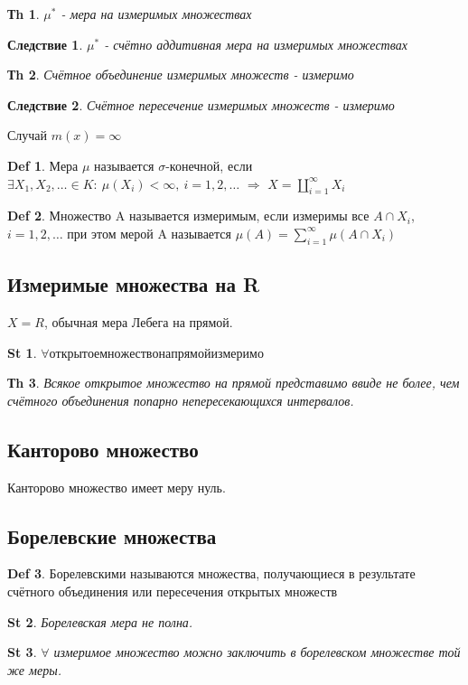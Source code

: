 \documentclass[14pt]{article}
\theoremstyle{plain}
\newtheorem{Thm}{Тh}
\newtheorem{St}{St}
\newtheorem{Sled}{Следствие}
\theoremstyle{definition}
\newtheorem{Def}{Def}
\begin{document}
		\begin{Thm}
			$\mu^*$ - мера на измеримых множествах
		\end{Thm}
		\begin{Sled}
			$\mu^{*}$ - счётно аддитивная мера на измеримых множествах
		\end{Sled}
		\begin{Thm}
			Счётное объединение измеримых множеств - измеримо
		\end{Thm}
		\begin{Sled}
			Счётное пересечение измеримых множеств - измеримо
		\end{Sled}
		Случай $m(x) = \infty$ \newline
		\begin{Def}
			Мера $\mu$ называется $\sigma$-конечной, если $\exists X_1, X_2, \dots \in K: \ \mu(X_i) < \infty, \ i = 1, 2, \dots $ $\Rightarrow$ $X = \coprod\limits_{i=1}^{\infty} X_i$
		\end{Def}
		\begin{Def}
			Множество A называется измеримым, если измеримы все $A \cap X_i$, $i = 1, 2, \dots$ при этом мерой A называется $\mu(A) = \sum\limits_{i=1}^{\infty} \mu(A \cap X_i)$
		\end{Def}
	\subsection{Измеримые множества на R}
		$X = R$, обычная мера Лебега на прямой.\newline
		\begin{St}
			$\forall открытое множество на прямой измеримо$
		\end{St}
		\begin{Thm}
			Всякое открытое множество на прямой представимо ввиде не более, чем счётного объединения попарно непересекающихся интервалов.
		\end{Thm}
	\subsection{Канторово множество}
		Канторово множество имеет меру нуль.
	\subsection{Борелевские множества}
		\begin{Def}
			Борелевскими называются множества, получающиеся в результате счётного объединения или пересечения открытых множеств
		\end{Def}
		\begin{St}
			Борелевская мера не полна. 
		\end{St}
		\begin{St}
			$\forall$ измеримое множество можно заключить в борелевском множестве той же меры. 
		\end{St}
\end{document}

